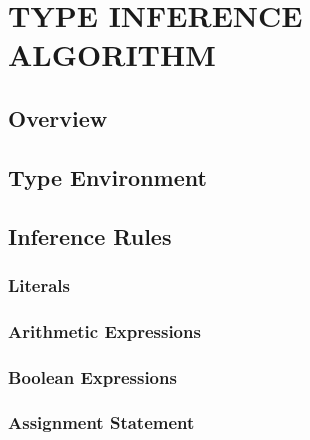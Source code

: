 \chapter{TYPE INFERENCE ALGORITHM}

\section{Overview}

\section{Type Environment}

\section{Inference Rules}

\subsection{Literals}

\subsection{Arithmetic Expressions}

\subsection{Boolean Expressions}

\subsection{Assignment Statement}

